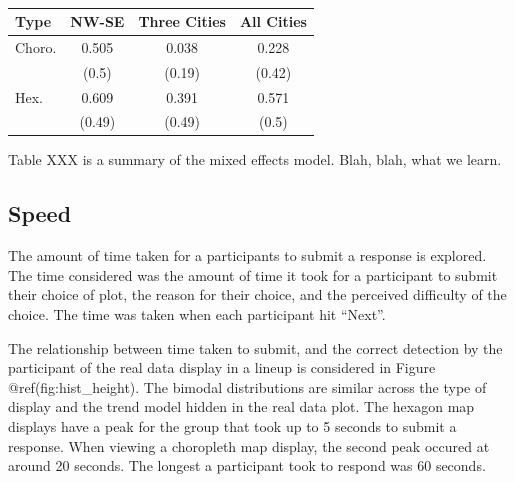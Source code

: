 \documentclass[conference,final,]{IEEEtran}
\begin{document}
\begin{table}

\caption{\label{tab:desc_stats}}
\centering
\begin{tabular}[t]{lccc}
\toprule
Type & NW-SE & Three Cities & All Cities\\
\midrule
Choro. & 0.505 & 0.038 & 0.228\\
 & (0.5) & (0.19) & (0.42)\\
Hex. & 0.609 & 0.391 & 0.571\\
 & (0.49) & (0.49) & (0.5)\\
\bottomrule
\end{tabular}
\end{table}

Table XXX is a summary of the mixed effects model. Blah, blah, what we
learn.

\hypertarget{speed}{%
\subsection{Speed}\label{speed}}

The amount of time taken for a participants to submit a response is
explored. The time considered was the amount of time it took for a
participant to submit their choice of plot, the reason for their choice,
and the perceived difficulty of the choice. The time was taken when each
participant hit ``Next''.

The relationship between time taken to submit, and the correct detection
by the participant of the real data display in a lineup is considered in
Figure @ref(fig:hist\_height). The bimodal distributions are similar
across the type of display and the trend model hidden in the real data
plot. The hexagon map displays have a peak for the group that took up to
5 seconds to submit a response. When viewing a choropleth map display,
the second peak occured at around 20 seconds. The longest a participant
took to respond was 60 seconds.
\end{document}

